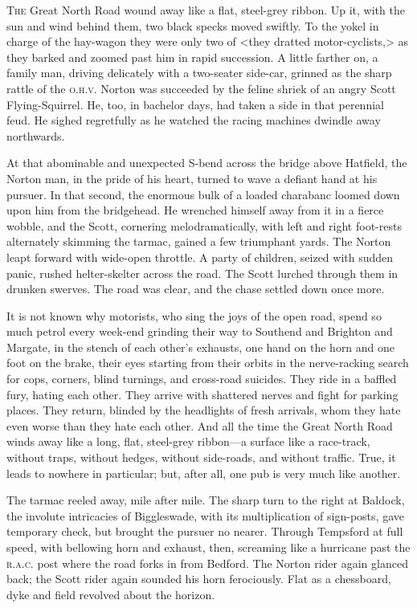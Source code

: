 	
	
\lettrine{T}{he} Great North Road wound away like a flat, steel-grey ribbon. Up it, with the sun and wind behind them, two black specks moved swiftly. To the yokel in charge of the hay-wagon they were only two of <they dratted motor-cyclists,> as they barked and zoomed past him in rapid succession. A little farther on, a family man, driving delicately with a two-seater side-car, grinned as the sharp rattle of the \textsc{o.h.v.} Norton was succeeded by the feline shriek of an angry Scott Flying-Squirrel. He, too, in bachelor days, had taken a side in that perennial feud. He sighed regretfully as he watched the racing machines dwindle away northwards.

At that abominable and unexpected S-bend across the bridge above Hatfield, the Norton man, in the pride of his heart, turned to wave a defiant hand at his pursuer. In that second, the enormous bulk of a loaded charabanc loomed down upon him from the bridgehead. He wrenched himself away from it in a fierce wobble, and the Scott, cornering melodramatically, with left and right foot-rests alternately skimming the tarmac, gained a few triumphant yards. The Norton leapt forward with wide-open throttle. A party of children, seized with sudden panic, rushed helter-skelter across the road. The Scott lurched through them in drunken swerves. The road was clear, and the chase settled down once more.

It is not known why motorists, who sing the joys of the open road, spend so much petrol every week-end grinding their way to Southend and Brighton and Margate, in the stench of each other's exhausts, one hand on the horn and one foot on the brake, their eyes starting from their orbits in the nerve-racking search for cops, corners, blind turnings, and cross-road suicides. They ride in a baffled fury, hating each other. They arrive with shattered nerves and fight for parking places. They return, blinded by the headlights of fresh arrivals, whom they hate even worse than they hate each other. And all the time the Great North Road winds away like a long, flat, steel-grey ribbon—a surface like a race-track, without traps, without hedges, without side-roads, and without traffic. True, it leads to nowhere in particular; but, after all, one pub is very much like another.

The tarmac reeled away, mile after mile. The sharp turn to the right at Baldock, the involute intricacies of Biggleswade, with its multiplication of sign-posts, gave temporary check, but brought the pursuer no nearer. Through Tempsford at full speed, with bellowing horn and exhaust, then, screaming like a hurricane past the \textsc{r.a.c.} post where the road forks in from Bedford. The Norton rider again glanced back; the Scott rider again sounded his horn ferociously. Flat as a chessboard, dyke and field revolved about the horizon.

